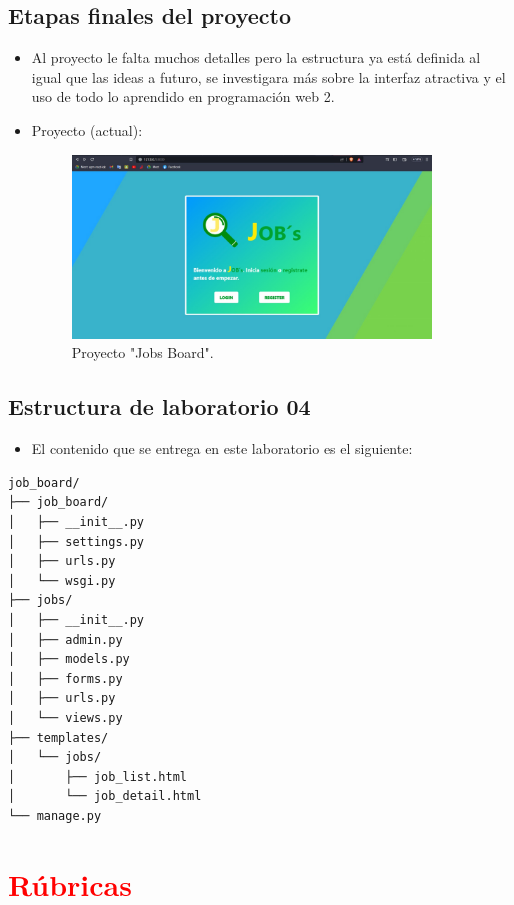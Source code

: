 \documentclass{article}
\begin{document}
\subsection{Etapas finales del proyecto}
\begin{itemize}	
		\item Al proyecto le falta muchos detalles pero la estructura ya está definida al igual que las ideas a futuro, se investigara más sobre la interfaz atractiva y el uso de todo lo aprendido en programación web 2.
        \item Proyecto (actual):
         \begin{figure}[h]
        \centering
        \includegraphics[width=0.9\textwidth]{img/home-2.jpeg}
        \caption{Proyecto "Jobs Board".}
        \label{fig:ejemplo}
    \end{figure}
	\end{itemize}
        
        
	\subsection{Estructura de laboratorio 04}
	\begin{itemize}	
		\item El contenido que se entrega en este laboratorio es el siguiente:
	\end{itemize}
\begin{lstlisting}[style=ascii-tree]
job_board/
├── job_board/
│   ├── __init__.py
│   ├── settings.py
│   ├── urls.py
│   └── wsgi.py
├── jobs/
│   ├── __init__.py
│   ├── admin.py
│   ├── models.py
│   ├── forms.py
│   ├── urls.py
│   └── views.py
├── templates/
│   └── jobs/
│       ├── job_list.html
│       └── job_detail.html
└── manage.py
\end{lstlisting}    

	

	\section{\textcolor{red}{Rúbricas}}
	
\end{document}
